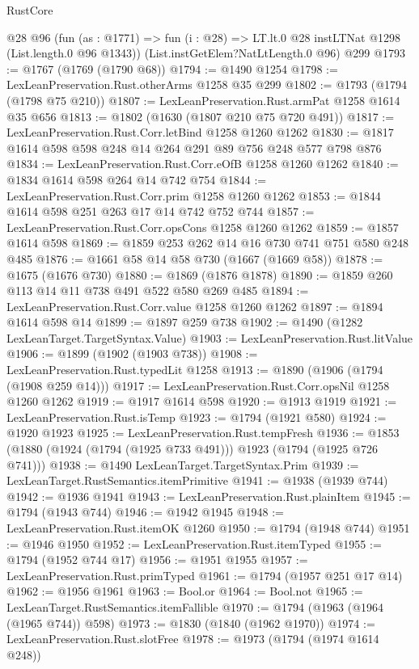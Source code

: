\begin{lexlean}{RustCore}
\begin{coremodule}
    @28
    @96
    (fun (as : @1771) => fun (i : @28) => LT.lt.{0} @28 instLTNat @1298 (List.length.{0} @96 @1343))
    (List.instGetElem?NatLtLength.{0} @96)
    @299
@1793 := @1767 (@1769 (@1790 @68))
@1794 := @1490 @1254
@1798 := LexLeanPreservation.Rust.otherArms @1258 @35 @299
@1802 := @1793 (@1794 (@1798 @75 @210))
@1807 := LexLeanPreservation.Rust.armPat @1258 @1614 @35 @656
@1813 := @1802 (@1630 (@1807 @210 @75 @720 @491))
@1817 := LexLeanPreservation.Rust.Corr.letBind @1258 @1260 @1262
@1830 := @1817 @1614 @598 @598 @248 @14 @264 @291 @89 @756 @248 @577 @798 @876
@1834 := LexLeanPreservation.Rust.Corr.eOfB @1258 @1260 @1262
@1840 := @1834 @1614 @598 @264 @14 @742 @754
@1844 := LexLeanPreservation.Rust.Corr.prim @1258 @1260 @1262
@1853 := @1844 @1614 @598 @251 @263 @17 @14 @742 @752 @744
@1857 := LexLeanPreservation.Rust.Corr.opsCons @1258 @1260 @1262
@1859 := @1857 @1614 @598
@1869 := @1859 @253 @262 @14 @16 @730 @741 @751 @580 @248 @485
@1876 := @1661 @58 @14 @58 @730 (@1667 (@1669 @58))
@1878 := @1675 (@1676 @730)
@1880 := @1869 (@1876 @1878)
@1890 := @1859 @260 @113 @14 @11 @738 @491 @522 @580 @269 @485
@1894 := LexLeanPreservation.Rust.Corr.value @1258 @1260 @1262
@1897 := @1894 @1614 @598 @14
@1899 := @1897 @259 @738
@1902 := @1490 (@1282 LexLeanTarget.TargetSyntax.Value)
@1903 := LexLeanPreservation.Rust.litValue
@1906 := @1899 (@1902 (@1903 @738))
@1908 := LexLeanPreservation.Rust.typedLit @1258
@1913 := @1890 (@1906 (@1794 (@1908 @259 @14)))
@1917 := LexLeanPreservation.Rust.Corr.opsNil @1258 @1260 @1262
@1919 := @1917 @1614 @598
@1920 := @1913 @1919
@1921 := LexLeanPreservation.Rust.isTemp
@1923 := @1794 (@1921 @580)
@1924 := @1920 @1923
@1925 := LexLeanPreservation.Rust.tempFresh
@1936 := @1853 (@1880 (@1924 (@1794 (@1925 @733 @491))) @1923 (@1794 (@1925 @726 @741)))
@1938 := @1490 LexLeanTarget.TargetSyntax.Prim
@1939 := LexLeanTarget.RustSemantics.itemPrimitive
@1941 := @1938 (@1939 @744)
@1942 := @1936 @1941
@1943 := LexLeanPreservation.Rust.plainItem
@1945 := @1794 (@1943 @744)
@1946 := @1942 @1945
@1948 := LexLeanPreservation.Rust.itemOK @1260
@1950 := @1794 (@1948 @744)
@1951 := @1946 @1950
@1952 := LexLeanPreservation.Rust.itemTyped
@1955 := @1794 (@1952 @744 @17)
@1956 := @1951 @1955
@1957 := LexLeanPreservation.Rust.primTyped
@1961 := @1794 (@1957 @251 @17 @14)
@1962 := @1956 @1961
@1963 := Bool.or
@1964 := Bool.not
@1965 := LexLeanTarget.RustSemantics.itemFallible
@1970 := @1794 (@1963 (@1964 (@1965 @744)) @598)
@1973 := @1830 (@1840 (@1962 @1970))
@1974 := LexLeanPreservation.Rust.slotFree
@1978 := @1973 (@1794 (@1974 @1614 @248))

\end{coremodule}
\end{lexlean}
